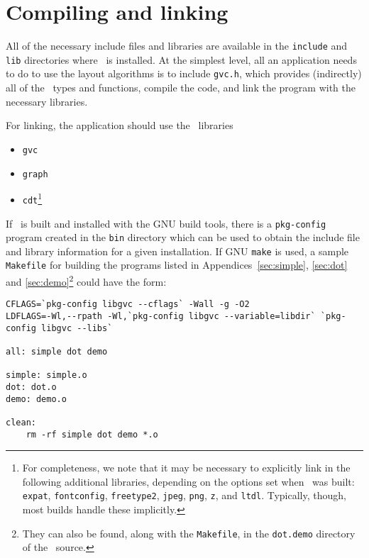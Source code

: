 \section{Compiling and linking}
\label{sec:build}
All of the necessary include files and libraries are available
in the {\tt include} and {\tt lib} directories where \gviz\
is installed. At the simplest level, all an application needs
to do to use the layout algorithms is to include {\tt gvc.h},
which provides (indirectly) all of the \gviz\ types and functions,
compile the code,
and link the program with the necessary libraries.

For linking, the application should use the \gviz\ libraries 
\begin{itemize}
\item {\tt gvc}
\item {\tt graph}
\item {\tt cdt}\footnote{
For completeness, we note that it may be necessary to explicitly
link in the following additional libraries, depending
on the options set when \gviz\ was built:
{\tt expat},
{\tt fontconfig},
{\tt freetype2},
{\tt jpeg},
{\tt png},
{\tt z}, and
{\tt ltdl}.
Typically, though, most builds handle these implicitly.}
\end{itemize}

If \gviz\ is built and installed with the GNU build tools, 
there is a {\tt pkg-config} program created in the {\tt bin} 
directory which can be used
to obtain the include file and library information for 
a given installation.
If GNU {\tt make} is used, a sample {\tt Makefile} for building the
programs listed in Appendices~\ref{sec:simple}, \ref{sec:dot} 
and \ref{sec:demo}\footnote{They
can also be found, along with the {\tt Makefile}, in the
{\tt dot.demo} directory of the \gviz\ source.}
could have the form:

\begin{verbatim}
CFLAGS=`pkg-config libgvc --cflags` -Wall -g -O2
LDFLAGS=-Wl,--rpath -Wl,`pkg-config libgvc --variable=libdir` `pkg-config libgvc --libs`

all: simple dot demo

simple: simple.o
dot: dot.o
demo: demo.o

clean:
    rm -rf simple dot demo *.o
\end{verbatim}

